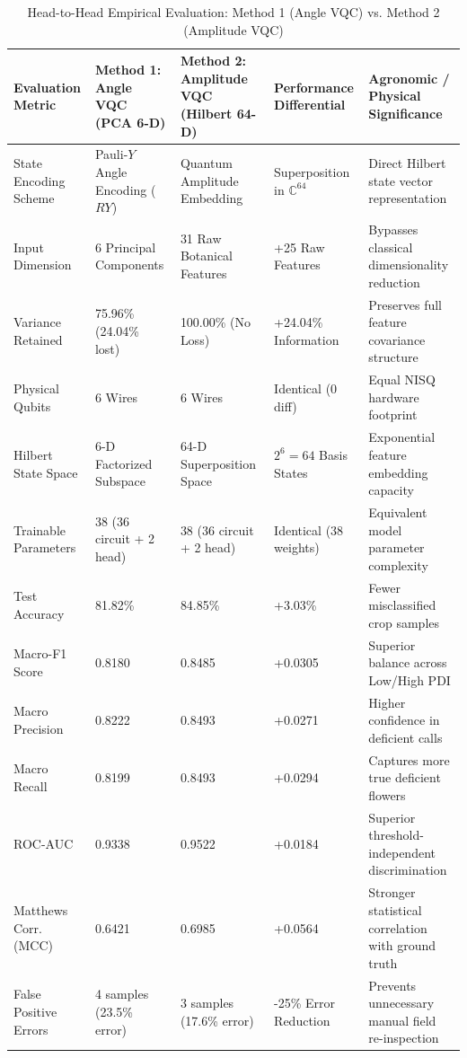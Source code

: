 \documentclass{ieeeaccess}
\begin{document}
\begin{table}[!t]
\caption{Head-to-Head Empirical Evaluation: Method 1 (Angle VQC) vs. Method 2 (Amplitude VQC)}
\label{tab:quantum_head_to_head}
\centering
\begin{tabular*}{\textwidth}{@{\extracolsep{\fill}}lllll@{}}
\toprule
\textbf{Evaluation Metric} & \textbf{Method 1: Angle VQC (PCA 6-D)} & \textbf{Method 2: Amplitude VQC (Hilbert 64-D)} & \textbf{Performance Differential} & \textbf{Agronomic / Physical Significance} \\
\midrule
State Encoding Scheme   & Pauli-$Y$ Angle Encoding ($RY$) & Quantum Amplitude Embedding & Superposition in $\mathbb{C}^{64}$ & Direct Hilbert state vector representation \\
Input Dimension         & 6 Principal Components         & 31 Raw Botanical Features   & +25 Raw Features           & Bypasses classical dimensionality reduction \\
Variance Retained       & 75.96\% (24.04\% lost)         & 100.00\% (No Loss)          & +24.04\% Information       & Preserves full feature covariance structure \\
Physical Qubits         & 6 Wires                        & 6 Wires                     & Identical (0 diff)         & Equal NISQ hardware footprint \\
Hilbert State Space     & 6-D Factorized Subspace        & 64-D Superposition Space    & $2^6 = 64$ Basis States    & Exponential feature embedding capacity \\
Trainable Parameters    & 38 (36 circuit + 2 head)       & 38 (36 circuit + 2 head)    & Identical (38 weights)     & Equivalent model parameter complexity \\
Test Accuracy           & 81.82\%                        & 84.85\%                     & +3.03\%                    & Fewer misclassified crop samples \\
Macro-F1 Score          & 0.8180                         & 0.8485                      & +0.0305                    & Superior balance across Low/High PDI \\
Macro Precision         & 0.8222                         & 0.8493                      & +0.0271                    & Higher confidence in deficient calls \\
Macro Recall            & 0.8199                         & 0.8493                      & +0.0294                    & Captures more true deficient flowers \\
ROC-AUC                 & 0.9338                         & 0.9522                      & +0.0184                    & Superior threshold-independent discrimination \\
Matthews Corr. (MCC)    & 0.6421                         & 0.6985                      & +0.0564                    & Stronger statistical correlation with ground truth \\
False Positive Errors   & 4 samples (23.5\% error)       & 3 samples (17.6\% error)    & -25\% Error Reduction      & Prevents unnecessary manual field re-inspection \\
\bottomrule
\end{tabular*}
\end{table}
\end{document}
